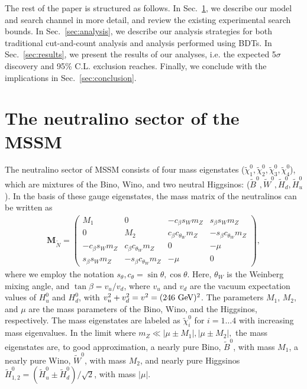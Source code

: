 \documentclass[a4paper,11pt]{article}
\renewcommand{\H}{\widetilde{H}^0}
\newcommand{\W}{\widetilde{W}^0}
\newcommand{\B}{\widetilde{B}^0}
\newcommand{\N}{\widetilde{\chi}^0}
\newcommand{\cb}{ c_\beta}
\newcommand{\cw}{ c_{\theta_W}}
\newcommand{\sinb}{ s_\beta}
\newcommand{\sw}{ s_W}
\newcommand{\mz}{ m_Z}
\begin{document}
The rest of the paper is structured as follows. In Sec.~\ref{sec:model}, we
describe our model and search channel in more detail, and review the existing
experimental search bounds. In Sec.~\ref{sec:analysis}, we describe our
analysis strategies for both traditional cut-and-count analysis and analysis
performed using BDTs. In Sec.~\ref{sec:results}, we present the results of our
analyses, i.e. the expected 5$\sigma$ discovery and 95\% C.L. exclusion
reaches. Finally, we conclude with the implications in
Sec.~\ref{sec:conclusion}.

\section{The neutralino sector of the MSSM}
\label{sec:model}

 
The neutralino sector of MSSM consists of four mass eigenstates
($\N_1,\N_2,\N_3,\N_4$), which are mixtures of the Bino, Wino, and two neutral
Higgsinos: ($\B,\W,\H_d,\H_u$). In the basis of these gauge
eigenstates, the mass matrix of the neutralinos can be written as
\begin{align}
  \mathbf{M}_{\widetilde{N}}=
  \begin{pmatrix}
    M_1         & 0            & -\cb\sw\mz & \sinb\sw\mz \\
    0           & M_2          & \cb\cw\mz  & -\sinb\cw\mz \\
    -\cb\sw\mz  & \cb\cw\mz    & 0          & -\mu \\
    \sinb\sw\mz & -\sinb\cw\mz & -\mu       & 0
  \end{pmatrix},
\end{align} 
where we employ the notation $s_\theta, c_\theta = \sin\theta, \cos\theta$. Here,  $\theta_W$ is the Weinberg mixing angle, 
and $\tan\beta= v_u/v_d$, where $v_u$ and $v_d$ are the vacuum
expectation values of $H_u^0$ and $H_d^0$, with $v_u^2+v_d^2=v^2=(246\ {\rm
GeV})^2$. The parameters $M_1$, $M_2$, and $\mu$ are the mass parameters of
the Bino, Wino, and the Higgsinos, respectively.
The mass eigenstates are labeled as $\N_i$ for $i=1 \ldots 4$ with increasing mass eigenvalues.
In the limit where $\mz \ll |\mu\pm M_1|, |\mu\pm M_2|,$ the mass eigenstates
are, to good approximation, a nearly pure Bino, $\B$, with mass $M_1$,
a nearly pure Wino, $\W$, with mass $M_2$, and nearly pure Higgsinos
$\H_{1,2} = (\H_u \pm \H_d)/\sqrt{2}$, with mass
$|\mu|$. 
\end{document}
